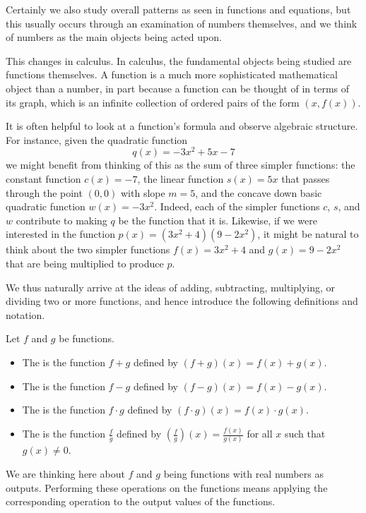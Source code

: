 \documentclass{ximera}
\begin{document}
	Certainly we also study overall patterns as seen in functions and equations, but this usually occurs through an examination of numbers themselves, 
	and we think of numbers as the main objects being acted upon.
	
	This changes in calculus.  In calculus, the fundamental objects being studied are functions themselves.  A function is a much more sophisticated 
	mathematical object than a number, in part because a function can be thought of in terms of its graph, which is an infinite collection of ordered 
	pairs of the form $(x,f(x))$.
	
	It is often helpful to look at a function's formula and observe algebraic structure.  For instance, given the quadratic function
	$$q(x) = -3x^2 + 5x - 7$$
	we might benefit from thinking of this as the sum of three simpler functions:  the constant function $c(x) = -7$, the linear function $s(x) = 5x$ that 
	passes through the point $(0,0)$ with slope $m = 5$, and the concave down basic quadratic function $w(x) = -3x^2$.  
	Indeed, each of the simpler functions $c$, $s$, and $w$ contribute to making $q$ be the function that it is.  Likewise, if we were interested in 
	the function $p(x) = (3x^2 + 4)(9 - 2x^2)$, it might be natural to think about the two simpler functions $f(x) = 3x^2 + 4$ and $g(x) = 9 - 2x^2$ 
	that are being multiplied to produce $p$.
	
	We thus naturally arrive at the ideas of adding, subtracting, multiplying, or dividing two or more functions, and hence introduce the following definitions and notation.
	\begin{definition}
		Let $f$ and $g$ be functions. 
		\begin{itemize}[label=\textbullet]
			\item The  is the function $f + g$ defined by $(f+g)(x) = f(x) + g(x)$.\\
			\item The  is the function $f - g$ defined by $(f-g)(x) = f(x) - g(x)$.\\
			\item The  is the function $f \cdot g$ defined by $(f \cdot g)(x) = f(x) \cdot g(x)$.\\
			\item The  is the function $\frac{f}{g}$ defined by $\left( \frac{f}{g} \right)(x) = \frac{f(x)}{g(x)}$ for all $x$ such that $g(x) \neq 0$.
		\end{itemize}
	\end{definition}
	We are thinking here about $f$ and $g$ being functions with real numbers as outputs. Performing these operations on the functions means applying 
	the corresponding operation to the output values of the functions.
	
\end{document}
